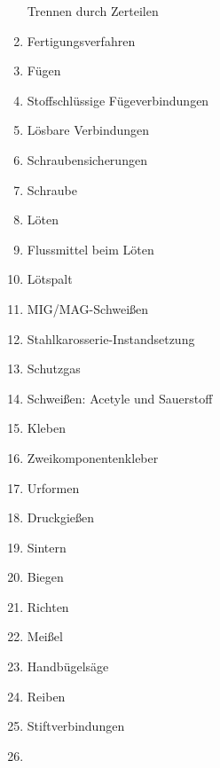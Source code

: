 \begin{enumerate}
  Trennen durch Zerteilen\\
\item
  Fertigungsverfahren\\
\item
  Fügen\\
\item
  Stoffschlüssige Fügeverbindungen\\
\item
  Lösbare Verbindungen\\
\item
  Schraubensicherungen\\
\item
  Schraube\\
\item
  Löten\\
\item
  Flussmittel beim Löten\\
\item
  Lötspalt\\
\item
  MIG/MAG-Schweißen\\
\item
  Stahlkarosserie-Instandsetzung\\
\item
  Schutzgas\\
\item
  Schweißen: Acetyle und Sauerstoff\\
\item
  Kleben\\
\item
  Zweikomponentenkleber\\
\item
  Urformen\\
\item
  Druckgießen\\
\item
  Sintern\\
\item
  Biegen\\
\item
  Richten\\
\item
  Meißel\\
\item
  Handbügelsäge\\
\item
  Reiben\\
\item
  Stiftverbindungen\\
\item

\end{enumerate}
